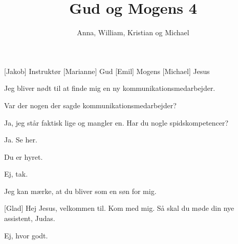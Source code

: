 \documentclass[a4paper,11pt]{article}
\title{Gud og Mogens 4}
\author{Anna, William, Kristian og Michael}
\begin{document}
\maketitle

\begin{roles}
[Jakob] Instruktør
[Marianne] Gud
[Emil] Mogens
[Michael] Jesus
\end{roles}


  
\begin{sketch}
 Jeg bliver nødt til at finde mig en ny kommunikationsmedarbejder.


 Var der nogen der sagde kommunikationsmedarbejder? 

 Ja, jeg står faktisk lige og mangler en. Har du nogle spidskompetencer?

 Ja. Se her.


 Du er hyret.

 Ej, tak. 

 Jeg kan mærke, at du bliver som en søn for mig.


[Glad] Hej Jesus, velkommen til.  Kom med mig. Så skal du møde din nye assistent, Judas. 


 Ej, hvor godt.

\end{sketch}
\end{document}
